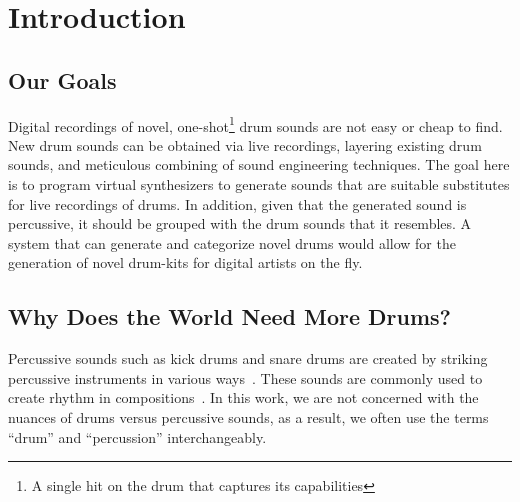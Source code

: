 \documentclass[\main/thesis.tex]{subfiles}
\begin{document}
\chapter{Introduction}


\section{Our Goals}
Digital recordings of novel, one-shot\footnote{A single hit on the drum that captures its capabilities} drum sounds are not easy or cheap to find. New drum sounds can be obtained via live recordings, layering existing drum sounds, and meticulous combining of sound engineering techniques. The goal here is to program virtual synthesizers to generate sounds that are suitable substitutes for live recordings of drums. In addition, given that the generated sound is percussive, it should be grouped with the drum sounds that it resembles. A system that can generate and categorize novel drums would allow for the generation of novel drum-kits for digital artists on the fly. 


\section{Why Does the World Need More Drums?}
Percussive sounds such as kick drums and snare drums are created by striking percussive instruments in various ways~\cite{barry2005drum}. These sounds are commonly used to create rhythm in compositions~\cite{needham1967percussion}. In this work, we are not concerned with the nuances of drums versus percussive sounds, as a result, we often use the terms \enquote{drum} and \enquote{percussion} interchangeably.
\end{document}
